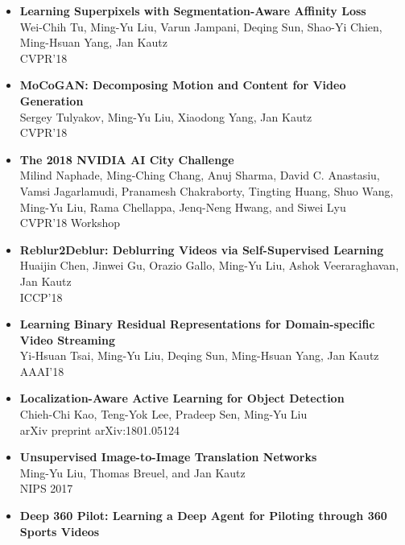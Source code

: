 \begin{itemize}
\item {\bf Learning Superpixels with Segmentation-Aware Affinity Loss}\\
       Wei-Chih Tu, Ming-Yu Liu, Varun Jampani, Deqing Sun, Shao-Yi Chien, Ming-Hsuan Yang, Jan Kautz\\
       CVPR'18 \vspace{-2mm}
\item {\bf MoCoGAN: Decomposing Motion and Content for Video Generation}\\
       Sergey Tulyakov, Ming-Yu Liu, Xiaodong Yang, Jan Kautz\\
       CVPR'18 \vspace{-2mm}
\item {\bf The 2018 NVIDIA AI City Challenge}\\
       Milind Naphade, Ming-Ching Chang, Anuj Sharma, David C. Anastasiu, Vamsi Jagarlamudi, Pranamesh Chakraborty, Tingting Huang, Shuo Wang, Ming-Yu Liu, Rama Chellappa, Jenq-Neng Hwang, and Siwei Lyu\\
       CVPR'18 Workshop \vspace{-2mm}
\item {\bf Reblur2Deblur: Deblurring Videos via Self-Supervised Learning}\\
       Huaijin Chen, Jinwei Gu, Orazio Gallo, Ming-Yu Liu, Ashok Veeraraghavan, Jan Kautz\\
       ICCP'18 \vspace{-2mm}       
\item {\bf Learning Binary Residual Representations for Domain-specific Video Streaming}\\
	   Yi-Hsuan Tsai, Ming-Yu Liu, Deqing Sun, Ming-Hsuan Yang, Jan Kautz\\
	   AAAI'18 \vspace{-2mm}
\item {\bf Localization-Aware Active Learning for Object Detection}\\
	   Chieh-Chi Kao, Teng-Yok Lee, Pradeep Sen, Ming-Yu Liu\\
       arXiv preprint arXiv:1801.05124	\vspace{-2mm}	
\item {\bf Unsupervised Image-to-Image Translation Networks}\\
	   Ming-Yu Liu, Thomas Breuel, and Jan Kautz\\
	   NIPS 2017\vspace{-2mm}
\item {\bf Deep 360 Pilot: Learning a Deep Agent for Piloting through 360 Sports Videos}\\

\end{itemize}
